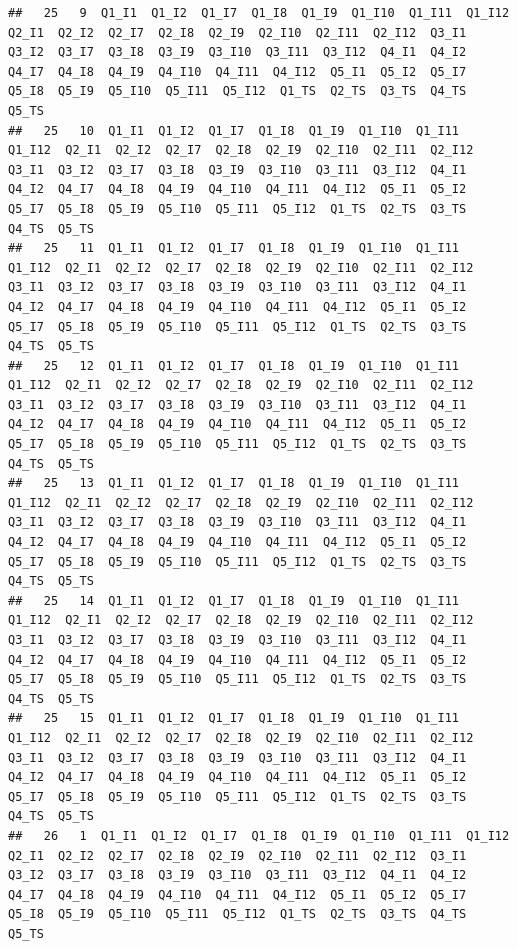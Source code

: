 \documentclass[
]{book}
\begin{document}
\begin{verbatim}
##   25   9  Q1_I1  Q1_I2  Q1_I7  Q1_I8  Q1_I9  Q1_I10  Q1_I11  Q1_I12  Q2_I1  Q2_I2  Q2_I7  Q2_I8  Q2_I9  Q2_I10  Q2_I11  Q2_I12  Q3_I1  Q3_I2  Q3_I7  Q3_I8  Q3_I9  Q3_I10  Q3_I11  Q3_I12  Q4_I1  Q4_I2  Q4_I7  Q4_I8  Q4_I9  Q4_I10  Q4_I11  Q4_I12  Q5_I1  Q5_I2  Q5_I7  Q5_I8  Q5_I9  Q5_I10  Q5_I11  Q5_I12  Q1_TS  Q2_TS  Q3_TS  Q4_TS  Q5_TS
##   25   10  Q1_I1  Q1_I2  Q1_I7  Q1_I8  Q1_I9  Q1_I10  Q1_I11  Q1_I12  Q2_I1  Q2_I2  Q2_I7  Q2_I8  Q2_I9  Q2_I10  Q2_I11  Q2_I12  Q3_I1  Q3_I2  Q3_I7  Q3_I8  Q3_I9  Q3_I10  Q3_I11  Q3_I12  Q4_I1  Q4_I2  Q4_I7  Q4_I8  Q4_I9  Q4_I10  Q4_I11  Q4_I12  Q5_I1  Q5_I2  Q5_I7  Q5_I8  Q5_I9  Q5_I10  Q5_I11  Q5_I12  Q1_TS  Q2_TS  Q3_TS  Q4_TS  Q5_TS
##   25   11  Q1_I1  Q1_I2  Q1_I7  Q1_I8  Q1_I9  Q1_I10  Q1_I11  Q1_I12  Q2_I1  Q2_I2  Q2_I7  Q2_I8  Q2_I9  Q2_I10  Q2_I11  Q2_I12  Q3_I1  Q3_I2  Q3_I7  Q3_I8  Q3_I9  Q3_I10  Q3_I11  Q3_I12  Q4_I1  Q4_I2  Q4_I7  Q4_I8  Q4_I9  Q4_I10  Q4_I11  Q4_I12  Q5_I1  Q5_I2  Q5_I7  Q5_I8  Q5_I9  Q5_I10  Q5_I11  Q5_I12  Q1_TS  Q2_TS  Q3_TS  Q4_TS  Q5_TS
##   25   12  Q1_I1  Q1_I2  Q1_I7  Q1_I8  Q1_I9  Q1_I10  Q1_I11  Q1_I12  Q2_I1  Q2_I2  Q2_I7  Q2_I8  Q2_I9  Q2_I10  Q2_I11  Q2_I12  Q3_I1  Q3_I2  Q3_I7  Q3_I8  Q3_I9  Q3_I10  Q3_I11  Q3_I12  Q4_I1  Q4_I2  Q4_I7  Q4_I8  Q4_I9  Q4_I10  Q4_I11  Q4_I12  Q5_I1  Q5_I2  Q5_I7  Q5_I8  Q5_I9  Q5_I10  Q5_I11  Q5_I12  Q1_TS  Q2_TS  Q3_TS  Q4_TS  Q5_TS
##   25   13  Q1_I1  Q1_I2  Q1_I7  Q1_I8  Q1_I9  Q1_I10  Q1_I11  Q1_I12  Q2_I1  Q2_I2  Q2_I7  Q2_I8  Q2_I9  Q2_I10  Q2_I11  Q2_I12  Q3_I1  Q3_I2  Q3_I7  Q3_I8  Q3_I9  Q3_I10  Q3_I11  Q3_I12  Q4_I1  Q4_I2  Q4_I7  Q4_I8  Q4_I9  Q4_I10  Q4_I11  Q4_I12  Q5_I1  Q5_I2  Q5_I7  Q5_I8  Q5_I9  Q5_I10  Q5_I11  Q5_I12  Q1_TS  Q2_TS  Q3_TS  Q4_TS  Q5_TS
##   25   14  Q1_I1  Q1_I2  Q1_I7  Q1_I8  Q1_I9  Q1_I10  Q1_I11  Q1_I12  Q2_I1  Q2_I2  Q2_I7  Q2_I8  Q2_I9  Q2_I10  Q2_I11  Q2_I12  Q3_I1  Q3_I2  Q3_I7  Q3_I8  Q3_I9  Q3_I10  Q3_I11  Q3_I12  Q4_I1  Q4_I2  Q4_I7  Q4_I8  Q4_I9  Q4_I10  Q4_I11  Q4_I12  Q5_I1  Q5_I2  Q5_I7  Q5_I8  Q5_I9  Q5_I10  Q5_I11  Q5_I12  Q1_TS  Q2_TS  Q3_TS  Q4_TS  Q5_TS
##   25   15  Q1_I1  Q1_I2  Q1_I7  Q1_I8  Q1_I9  Q1_I10  Q1_I11  Q1_I12  Q2_I1  Q2_I2  Q2_I7  Q2_I8  Q2_I9  Q2_I10  Q2_I11  Q2_I12  Q3_I1  Q3_I2  Q3_I7  Q3_I8  Q3_I9  Q3_I10  Q3_I11  Q3_I12  Q4_I1  Q4_I2  Q4_I7  Q4_I8  Q4_I9  Q4_I10  Q4_I11  Q4_I12  Q5_I1  Q5_I2  Q5_I7  Q5_I8  Q5_I9  Q5_I10  Q5_I11  Q5_I12  Q1_TS  Q2_TS  Q3_TS  Q4_TS  Q5_TS
##   26   1  Q1_I1  Q1_I2  Q1_I7  Q1_I8  Q1_I9  Q1_I10  Q1_I11  Q1_I12  Q2_I1  Q2_I2  Q2_I7  Q2_I8  Q2_I9  Q2_I10  Q2_I11  Q2_I12  Q3_I1  Q3_I2  Q3_I7  Q3_I8  Q3_I9  Q3_I10  Q3_I11  Q3_I12  Q4_I1  Q4_I2  Q4_I7  Q4_I8  Q4_I9  Q4_I10  Q4_I11  Q4_I12  Q5_I1  Q5_I2  Q5_I7  Q5_I8  Q5_I9  Q5_I10  Q5_I11  Q5_I12  Q1_TS  Q2_TS  Q3_TS  Q4_TS  Q5_TS

\end{verbatim}
\end{document}
